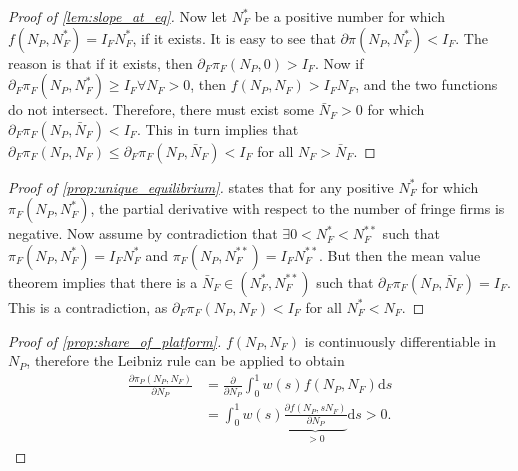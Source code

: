 \documentclass[a4paper]{article}
\newcommand{\ds}{\mathrm{d}s}
\begin{document}
\begin{proof}[Proof of \cref{lem:slope_at_eq}]
    Now let $N_F^*$ be a positive number for which $f(N_P, N_F^*) = I_F N_F^*$, if it exists.
    It is easy to see that $\partial \pi(N_P, N_F^*) < I_F$.
    The reason is that if it exists, then $\partial_F \pi_F(N_P, 0) > I_F$.
    Now if $\partial_F \pi_F(N_P, N_F^*) \geq I_F \forall N_F > 0$, then $f(N_P, N_F) > I_F N_F$, and the two functions do not intersect.
    Therefore, there must exist some $\bar{N}_F > 0$ for which $\partial_F \pi_F(N_P, \bar{N}_F) < I_F$.
    This in turn implies that $\partial_F \pi_F(N_P, N_F) \leq \partial_F \pi_F(N_P, \bar{N}_F) < I_F$ for all $N_F > \bar{N}_F$.
\end{proof}

\begin{proof}[Proof of \cref{prop:unique_equilibrium}]
     states that for any positive $N_F^*$ for which $\pi_F(N_P, N_F^*)$, the partial derivative with respect to the number of fringe firms is negative.
    Now assume by contradiction that $\exists 0 < N_F^* < N_F^{**}$ such that $\pi_F(N_P, N_F^*) = I_F N_F^*$ and $\pi_F(N_P, N_F^{**}) = I_F N_F^{**}$.
    But then the mean value theorem implies that there is a $\bar{N}_F \in (N_F^*, N_F^{**})$ such that $\partial_F \pi_F(N_P, \bar{N}_F) = I_F$.
    This is a contradiction, as $\partial_F \pi_F(N_P, N_F) < I_F$ for all $N_F^* < N_F$.
\end{proof}

\begin{proof}[Proof of \cref{prop:share_of_platform}]
    $f(N_P, N_F)$ is continuously differentiable in $N_P$, therefore the Leibniz rule can be applied to obtain
    \begin{align*}
        \frac{\partial \pi_P(N_P, N_F)}{\partial N_P} &= \frac{\partial}{\partial N_P} \int_0^1 w(s) f(N_P, N_F) \ds \\
        &= \int_0^1 w(s) \underbrace{\frac{\partial f(N_P, sN_F)}{\partial N_P}}_{> 0} \ds > 0.
    \end{align*}
\end{proof}
\end{document}
